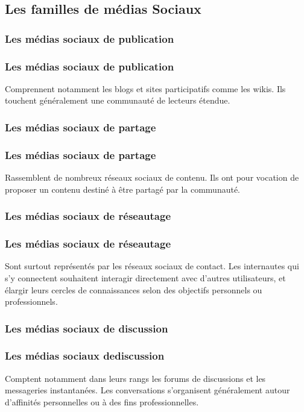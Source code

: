 \documentclass{beamer}
\begin{document}
  \subsection{Les familles de médias Sociaux}
   
   \subsubsection{Les médias sociaux de publication}
   \begin{frame}
    \frametitle{Les médias sociaux de publication}
    Comprennent notamment les blogs et sites participatifs comme les wikis. Ils touchent généralement une communauté de lecteurs étendue.
   \end{frame}

   \subsubsection{Les médias sociaux de partage}
   \begin{frame}
    \frametitle{Les médias sociaux de partage}
    Rassemblent de nombreux réseaux sociaux de contenu. Ils ont pour vocation de proposer un contenu destiné à être partagé par la communauté.
   \end{frame}

   \subsubsection{Les médias sociaux de réseautage}
   \begin{frame}
    \frametitle{Les médias sociaux de réseautage}
    Sont surtout représentés par les réseaux sociaux de contact. Les internautes qui s’y connectent souhaitent interagir directement avec d’autres utilisateurs, et élargir leurs cercles de connaissances selon des objectifs personnels ou professionnels.
   \end{frame}

   \subsubsection{Les médias sociaux de discussion}
   \begin{frame}
    \frametitle{Les médias sociaux dediscussion}
    Comptent notamment dans leurs rangs les forums de discussions et les messageries instantanées. Les conversations s’organisent généralement autour d’affinités personnelles ou à des fins professionnelles.
   \end{frame}
   
\end{document}
